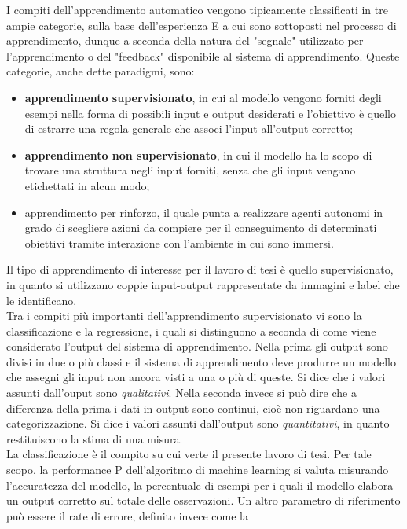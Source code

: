 I compiti dell'apprendimento automatico vengono tipicamente classificati in tre ampie categorie, 
sulla base dell’esperienza E a cui sono sottoposti nel processo di apprendimento, dunque a seconda 
della natura del "segnale" utilizzato per l'apprendimento o del "feedback" disponibile al sistema di
 apprendimento. Queste categorie, anche dette paradigmi, sono:
 \begin{itemize}
\item \textbf{apprendimento supervisionato}, in cui al modello vengono forniti degli esempi nella forma
 di possibili input e output desiderati e l'obiettivo è quello di estrarre una regola
  generale che associ l'input all'output corretto;
\item \textbf{apprendimento non supervisionato}, in cui il modello ha lo scopo di trovare una
 struttura negli 
input forniti, senza che gli input vengano etichettati in alcun modo;
\item apprendimento per rinforzo, il quale punta a realizzare agenti 
autonomi in grado di scegliere
 azioni da compiere per il conseguimento di determinati obiettivi tramite interazione con l'ambiente
  in cui sono immersi. 
\end{itemize}
Il tipo di apprendimento di interesse per il lavoro di tesi è quello supervisionato, in quanto si utilizzano coppie input-output 
rappresentate da immagini e label che le identificano. \\
Tra i compiti più importanti dell’apprendimento supervisionato vi sono la classificazione
 e la regressione, i quali si distinguono a seconda di come viene considerato l’output 
 del sistema di apprendimento. 
 Nella prima gli output sono divisi in due o più classi e il sistema di apprendimento 
 deve produrre un modello che assegni gli input non ancora visti a una o più di queste. 
 Si dice che i valori assunti dall'ouput sono \emph{qualitativi}. 
 Nella seconda invece si può dire che a differenza della prima i dati in output sono continui, 
 cioè non riguardano una categorizzazione. Si dice i valori assunti dall'output sono \emph{quantitativi},
  in quanto restituiscono la stima di una misura. \\
La classificazione è il compito su cui verte il presente lavoro di tesi.
 Per tale scopo, la performance P dell’algoritmo di machine learning si valuta misurando
  l’accuratezza del modello, la percentuale di esempi per i quali il modello elabora un output 
  corretto sul totale delle osservazioni. Un altro parametro di riferimento può essere il rate di errore,
   definito invece come la
